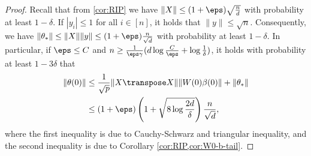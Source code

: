 \begin{proof}
    Recall that from \cref{cor:RIP} we have $\|X\|\leq (1+\eps)\sqrt{\frac{n}{d}}$ with probability at least $1-\delta$. If $|y_i|\leq 1$ for all $i\in[n]$, it holds that $\|y\|\leq \sqrt{n}$. Consequently, we have $\|\theta_*\| \leq \|X\|\|y\| \leq (1+\eps)\frac{n}{\sqrt{d}}$ with probability at least $1-\delta$. In particular, if $\eps \leq C$ and $n \geq \frac{1}{\eps\gamma} (d\log\frac{C}{\eps} + \log\frac{1}{\delta})$, it holds with probability at least $1-3\delta$ that
    \begin{align*}
        \|\theta(0)\| & \leq \frac{1}{\sqrt{p}}\|X\transpose X\|\|W(0) \beta(0)\| + \|\theta_*\| \\
        & \leq (1+\eps)\left(1 + \sqrt{8\log\frac{2d}{\delta}}\right)\frac{n}{\sqrt{d}},
    \end{align*}
    where the first inequality is due to Cauchy-Schwarz and triangular inequality, and the second inequality is due to Corollary \ref{cor:RIP,cor:W0-b-tail}.
\end{proof}
